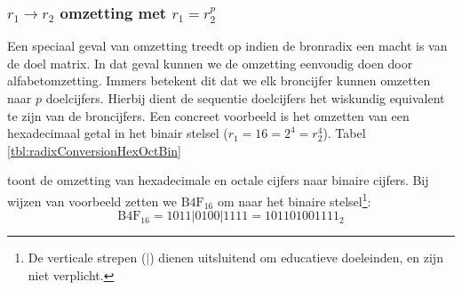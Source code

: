 \subsubsection{$r_1\rightarrow r_2$ omzetting met $r_1=r_2^p$}
Een speciaal geval van omzetting treedt op indien de bronradix een macht is van de doel matrix. In dat geval kunnen we de omzetting eenvoudig doen door alfabetomzetting. Immers betekent dit dat we elk broncijfer kunnen omzetten naar $p$ doelcijfers. Hierbij dient de sequentie doelcijfers het wiskundig equivalent te zijn van de broncijfers. Een concreet voorbeeld is het omzetten van een hexadecimaal getal in het binair stelsel ($r_1=16=2^4=r_2^4$). Tabel \ref{tbl:radixConversionHexOctBin}
\begin{table}[hbt]
\centering
{}
\caption{Radix-conversie van hexadecimaal en octaal naar binair.}
\end{table}
toont de omzetting van hexadecimale en octale cijfers naar binaire cijfers. Bij wijzen van voorbeeld zetten we $\mbox{B4F}_{16}$ om naar het binaire stelsel\footnote{De verticale strepen ($|$) dienen uitsluitend om educatieve doeleinden, en zijn niet verplicht.}:
\begin{equation}
\mbox{B4F}_{16}=1011|0100|1111=101101001111_2
\end{equation}

